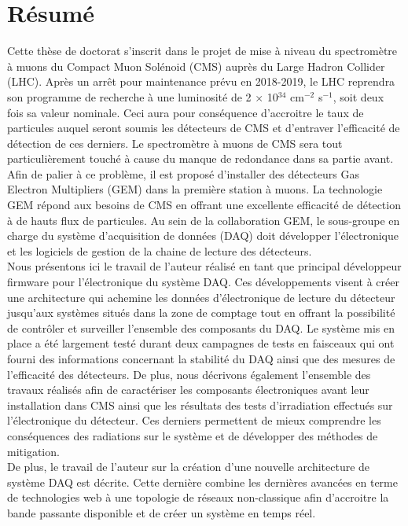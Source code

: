 \chapter*{Résumé}

  Cette thèse de doctorat s'inscrit dans le projet de mise à niveau du spectromètre à muons du Compact Muon Solénoid (CMS) auprès du Large Hadron Collider (LHC). Après un arrêt pour maintenance prévu en 2018-2019, le LHC reprendra son programme de recherche à une luminosité de 2 $\times$ 10$^{34}$ cm$^{-2}$ s$^{-1}$, soit deux fois sa valeur nominale. Ceci aura pour conséquence d'accroitre le taux de particules auquel seront soumis les détecteurs de CMS et d'entraver l'efficacité de détection de ces derniers. Le spectromètre à muons de CMS sera tout particulièrement touché à cause du manque de redondance dans sa partie avant. Afin de palier à ce problème, il est proposé d'installer des détecteurs Gas Electron Multipliers (GEM) dans la première station à muons. La technologie GEM répond aux besoins de CMS en offrant une excellente efficacité de détection à de hauts flux de particules. Au sein de la collaboration GEM, le sous-groupe en charge du système d'acquisition de données (DAQ) doit développer l'électronique et les logiciels de gestion de la chaine de lecture des détecteurs. \\

  Nous présentons ici le travail de l'auteur réalisé en tant que principal développeur firmware pour l'électronique du système DAQ. Ces développements visent à créer une architecture qui achemine les données d'électronique de lecture du détecteur jusqu'aux systèmes situés dans la zone de comptage tout en offrant la possibilité de contrôler et surveiller l'ensemble des composants du DAQ. Le système mis en place a été largement testé durant deux campagnes de tests en faisceaux qui ont fourni des informations concernant la stabilité du DAQ ainsi que des mesures de l'efficacité des détecteurs. De plus, nous décrivons également l'ensemble des travaux réalisés afin de caractériser les composants électroniques avant leur installation dans CMS ainsi que les résultats des tests d'irradiation effectués sur l'électronique du détecteur. Ces derniers permettent de mieux comprendre les conséquences des radiations sur le système et de développer des méthodes de mitigation. \\

  De plus, le travail de l'auteur sur la création d'une nouvelle architecture de système DAQ est décrite. Cette dernière combine les dernières avancées en terme de technologies web à une topologie de réseaux non-classique afin d'accroitre la bande passante disponible et de créer un système en temps réel.
